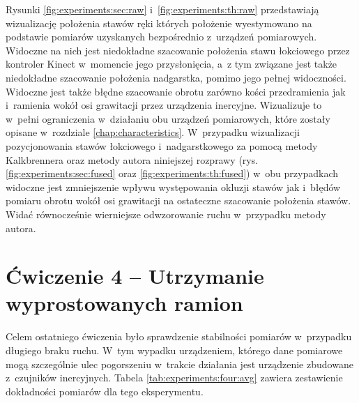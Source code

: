 Rysunki \ref{fig:experiments:sec:raw} i~\ref{fig:experiments:th:raw} przedstawiają wizualizację położenia stawów ręki których położenie wyestymowano na podstawie pomiarów uzyskanych bezpośrednio z~urządzeń pomiarowych.
Widoczne na nich jest niedokładne szacowanie położenia stawu łokciowego przez kontroler Kinect w~momencie jego przysłonięcia, a~z tym związane jest także niedokładne szacowanie położenia nadgarstka, pomimo jego pełnej widoczności. Widoczne jest także błędne szacowanie obrotu zarówno kości przedramienia jak i~ramienia
wokół osi grawitacji przez urządzenia inercyjne. Wizualizuje to w~pełni ograniczenia w~działaniu obu urządzeń pomiarowych, które zostały opisane w~rozdziale \ref{chap:characteristics}. W~przypadku wizualizacji pozycjonowania stawów łokciowego i~nadgarstkowego 
za pomocą metody Kalkbrennera oraz metody autora niniejszej rozprawy (rys. \ref{fig:experiments:sec:fused} oraz \ref{fig:experiments:th:fused}) w~obu przypadkach widoczne jest zmniejszenie wpływu występowania okluzji stawów jak i~błędów pomiaru obrotu wokół osi grawitacji
na ostateczne szacowanie położenia stawów. Widać równocześnie wierniejsze odwzorowanie ruchu w~przypadku metody autora.\\

\section*{Ćwiczenie 4 -- Utrzymanie wyprostowanych ramion}
Celem ostatniego ćwiczenia było sprawdzenie stabilności pomiarów w~przypadku długiego braku ruchu. W~tym wypadku urządzeniem, którego dane pomiarowe mogą szczególnie ulec pogorszeniu w~trakcie działania jest urządzenie zbudowane z~czujników inercyjnych. Tabela \ref{tab:experiments:four:avg} zawiera zestawienie dokładności pomiarów dla tego eksperymentu.

